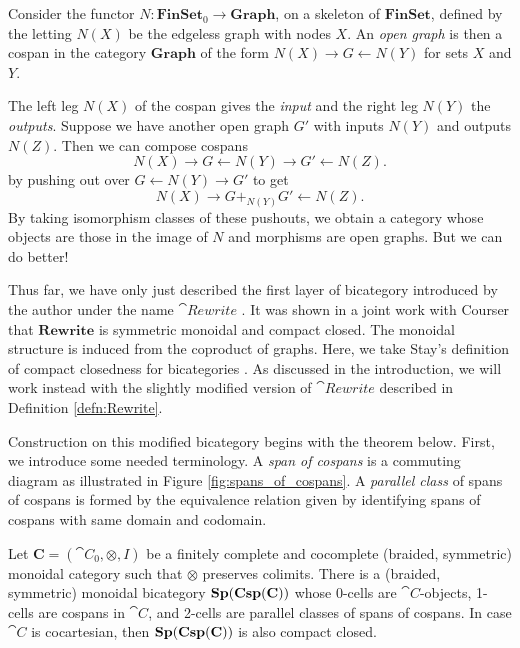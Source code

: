 \begin{defn}
	\label{def:Open_Graph}
	Consider the functor 
		$N \colon \mathbf{FinSet}_0 \to \mathbf{Graph}$, 
	on a skeleton of $\mathbf{FinSet}$, 
	defined by the letting 
	$N(X)$ be the edgeless graph 
	with nodes $X$.  
	An \emph{open graph} is then 
	a cospan in the category 
		$\mathbf{Graph}$ 
	of the form 
		$N(X) \to G \gets N(Y)$ 
	for sets $X$ and $Y$.
\end{defn}

The left leg $N(X)$ of the cospan 
gives the \emph{input} and 
the right leg $N(Y)$ the \emph{outputs}.  
Suppose we have another open graph $G'$ 
with inputs $N(Y)$ and outputs $N(Z)$.  
Then we can compose cospans 
\[
	N(X) \to G \gets N(Y) \to G' \gets N(Z). 
\] 
by pushing out over 
$G \gets N(Y) \to G'$ to get 
\[
	N(X) \to G +_{ N ( Y ) } G' \gets N(Z).
\] 
By taking isomorphism classes 
of these pushouts, 
we obtain a category whose 
objects are those in the image of $N$ 
and morphisms are open graphs. 
But we can do better! 

Thus far, we have only 
just described the first layer 
of bicategory
introduced by the author 
under the name $\cat{Rewrite}$
\cite{Cicala_SpansCospans}.
It was shown in a joint work with Courser
\cite{CicalaCourser_BicatSpansCospan} 
that $\mathbf{Rewrite}$ is 
symmetric monoidal and compact closed. 
The monoidal structure is 
induced from the coproduct of graphs.  
Here, we take Stay's definition 
of compact closedness for bicategories
\cite{Stay_CompactClosedBicats}. 
As discussed in the introduction, 
we will work instead with
the slightly modified version of $\cat{Rewrite}$
described in Definition \ref{defn:Rewrite}.

Construction on this modified bicategory
begins with the theorem below.
First, we introduce some needed terminology.
A \emph{span of cospans} is 
a commuting diagram as illustrated 
in Figure \ref{fig:spans_of_cospans}.  
A \emph{parallel class} of spans of cospans is
formed by the equivalence relation 
given by identifying
spans of cospans
with same domain and codomain.

\begin{thm}
	\label{thm:SpCspC_is_SMCC_bicategory}
	Let $\mathbf{C} = (\cat{C}_0,\otimes,I)$ 
	be a finitely complete and cocomplete
	(braided, symmetric) monoidal category 
	such that $\otimes$ preserves colimits.   
	There is a 
	(braided, symmetric) monoidal bicategory 
	$ \mathbf{Sp(Csp(C))} $ 
	whose 
	0-cells are $\cat{C}$-objects, 
	1-cells are cospans in $\cat{C}$, and 
	2-cells are	parallel classes 
	of spans of cospans.
	In case $\cat{C}$ is cocartesian, 
	then $\mathbf{Sp(Csp(C))}$ is also compact closed.
\end{thm}

